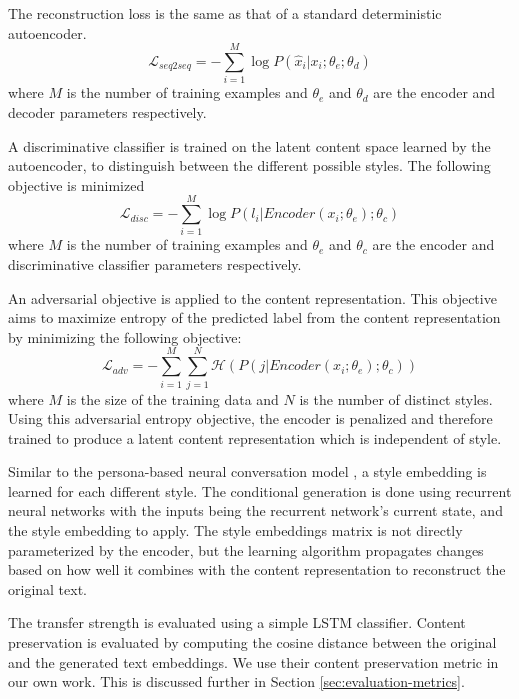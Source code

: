 The reconstruction loss is the same as that of a standard deterministic autoencoder.
\begin{equation}
	\mathcal{L}_{seq2seq} = -\sum_{i=1}^M \log P(\hat{x}_i|x_i;\theta_e;\theta_d)
\end{equation}
where $M$ is the number of training examples and $\theta_e$ and $\theta_d$ are the encoder and decoder parameters respectively.

A discriminative classifier is trained on the latent content space learned by the autoencoder, to distinguish between the different possible styles. The following objective is minimized
\begin{equation}
	\mathcal{L}_{disc} = -\sum_{i=1}^M \log P(l_i|Encoder(x_i;\theta_e);\theta_c)
\end{equation}
where $M$ is the number of training examples and $\theta_e$ and $\theta_c$ are the encoder and discriminative classifier parameters respectively.

An adversarial objective is applied to the content representation. This objective aims to maximize entropy of the predicted label from the content representation by minimizing the following objective:
\begin{equation}
	\mathcal{L}_{adv} = -\sum_{i=1}^M\sum_{j=1}^N \mathcal{H}(P(j|Encoder(x_i; \theta_e); \theta_c))
\end{equation}
where $M$ is the size of the training data and $N$ is the number of distinct styles. Using this adversarial entropy objective, the encoder is penalized and therefore trained to produce a latent content representation which is independent of style.

Similar to the persona-based neural conversation model \citep{li2016persona}, a style embedding is learned for each different style. The conditional generation is done using recurrent neural networks with the inputs being the recurrent network's current state, and the style embedding to apply. The style embeddings matrix is not directly parameterized by the encoder, but the learning algorithm propagates changes based on how well it combines with the content representation to reconstruct the original text.

The transfer strength is evaluated using a simple LSTM classifier. Content preservation is evaluated by computing the cosine distance between the original and the generated text embeddings. We use their content preservation metric in our own work. This is discussed further in Section \ref{sec:evaluation-metrics}.


